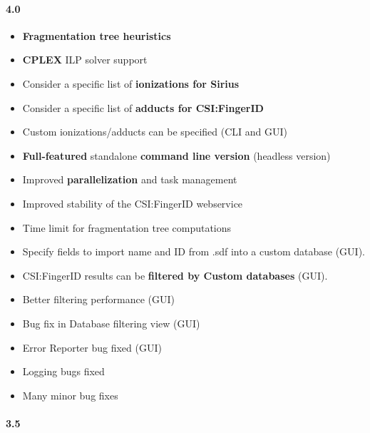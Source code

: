 \paragraph{4.0}
\begin{itemize}
\item
   \textbf{Fragmentation tree heuristics}
\item
   \textbf{CPLEX} ILP solver support
\item
   Consider a specific list of \textbf{ionizations for Sirius}
\item
   Consider a specific list of \textbf{adducts for CSI:FingerID}
\item
   Custom ionizations/adducts can be specified (CLI and GUI)
\item
  \textbf{Full-featured} standalone \textbf{command line version} (headless version)
\item
  Improved \textbf{parallelization} and task management
\item
  Improved stability of the CSI:FingerID webservice
\item
  Time limit for fragmentation tree computations
\item
  Specify fields to import name and ID from .sdf into a custom database (GUI).
\item
  CSI:FingerID results can be \textbf{filtered by Custom databases} (GUI).
\item
  Better filtering performance (GUI)
\item
  Bug fix in Database filtering view (GUI)
\item
  Error Reporter bug fixed (GUI)
\item
  Logging bugs fixed
\item
  Many minor bug fixes
\end{itemize}


\paragraph{3.5}

